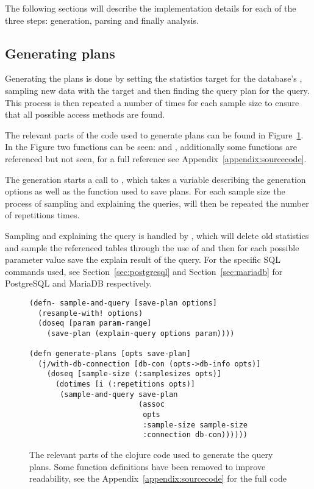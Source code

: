 The following sections will describe the implementation details for each of the
three steps: generation, parsing and finally analysis.

\subsection{Generating plans}\label{sec:generatingplans}
Generating the plans is done by setting the statistics target for the database's
, sampling new data with the target and then finding the query plan for
the query. This process is then repeated a number of times for each sample size
to ensure that all possible access methods are found.

The relevant parts of the code used to generate plans can be found in
Figure~\ref{fig:clj:generating}. In the Figure two functions can be seen:
 and , additionally some functions are
referenced but not seen, for a full reference see Appendix~\ref{appendix:sourcecode}.

The generation starts a call to , which takes a variable
describing the generation options as well as the function used to save plans.
For each sample size the process of sampling and explaining the queries, will
then be repeated the number of repetitions times.

Sampling and explaining the query is handled by , which
will delete old statistics and sample the referenced tables through the use of
 and then for each possible parameter value save the explain
result of the query. For the specific SQL commands used, see
Section~\ref{sec:postgresql} and Section~\ref{sec:mariadb} for PostgreSQL and MariaDB respectively.

\begin{figure}[ht]
  \begin{verbatim}
(defn- sample-and-query [save-plan options]
  (resample-with! options)
  (doseq [param param-range]
    (save-plan (explain-query options param))))

(defn generate-plans [opts save-plan]
  (j/with-db-connection [db-con (opts->db-info opts)]
    (doseq [sample-size (:samplesizes opts)]
      (dotimes [i (:repetitions opts)]
       (sample-and-query save-plan
                         (assoc
                          opts
                          :sample-size sample-size
                          :connection db-con))))))
   \end{verbatim}
   \caption[The clojure code to generate a query]{The relevant parts of the
     clojure code used to generate the query plans. Some function definitions
     have been removed to improve readability, see the
     Appendix~\ref{appendix:sourcecode} for the full code}
\label{fig:clj:generating}
\end{figure}

